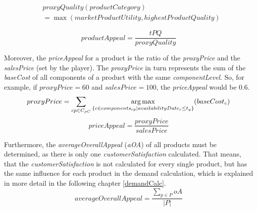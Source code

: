 \begin{equation}
\label{proxyQuality}
\begin{aligned}
    & proxyQuality(productCategory) \\
    & = \max(marketProductUtility, highestProductQuality)
\end{aligned}    
\end{equation}

\begin{equation}
    productAppeal = \dfrac{tPQ}{proxyQuality}
\end{equation}

Moreover, the \textit{priceAppeal} for a product is the ratio of the \textit{proxyPrice} and the \textit{salesPrice} (set by the player). The \textit{proxyPrice} in turn represents the sum of the \textit{baseCost} of all components of a product with the same \textit{componentLevel}. So, for example, if $proxyPrice = 60$ and $salesPrice = 100$, the \textit{priceAppeal} would be $0.6$.
\begin{equation}
    proxyPrice = \sum_{cp \in C_{pC}} \operatorname*{arg\,max}\limits_{\{c \in components_{cp}| availabilityDate_c \leq t_y\}}(baseCost_c)\\
\end{equation}
\begin{equation}
    priceAppeal = \dfrac{proxyPrice}{salesPrice}
\end{equation}

Furthermore, the \textit{averageOverallAppeal} (\textit{\gls{aOA}}) of all products must be determined, as there is only one \textit{customerSatisfaction} calculated. That means, that the \textit{customerSatisfaction} is not calculated for every single product, but has the same influence for each product in the demand calculation, which is explained in more detail in the following chapter \ref{demandCalc}.
\begin{equation}
    averageOverallAppeal = \frac{\sum_{p \in P} oA}{|P|}
\end{equation}

